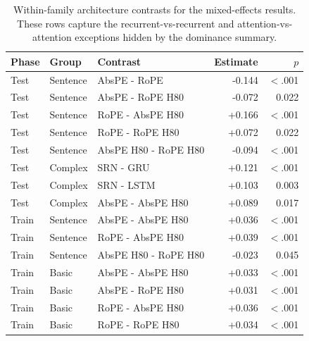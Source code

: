\begin{table}[t]
\centering\scriptsize
\begin{tabular}{@{}lllrr@{}}
\toprule
\textbf{Phase} & \textbf{Group} & \textbf{Contrast} & \textbf{Estimate} & $p$ \\
\midrule
Test & Sentence & AbsPE - RoPE & -0.144 & $<$.001 \\
Test & Sentence & AbsPE - RoPE H80 & -0.072 & 0.022 \\
Test & Sentence & RoPE - AbsPE H80 & +0.166 & $<$.001 \\
Test & Sentence & RoPE - RoPE H80 & +0.072 & 0.022 \\
Test & Sentence & AbsPE H80 - RoPE H80 & -0.094 & $<$.001 \\
Test & Complex & SRN - GRU & +0.121 & $<$.001 \\
Test & Complex & SRN - LSTM & +0.103 & 0.003 \\
Test & Complex & AbsPE - AbsPE H80 & +0.089 & 0.017 \\
Train & Sentence & AbsPE - AbsPE H80 & +0.036 & $<$.001 \\
Train & Sentence & RoPE - AbsPE H80 & +0.039 & $<$.001 \\
Train & Sentence & AbsPE H80 - RoPE H80 & -0.023 & 0.045 \\
Train & Basic & AbsPE - AbsPE H80 & +0.033 & $<$.001 \\
Train & Basic & AbsPE - RoPE H80 & +0.031 & $<$.001 \\
Train & Basic & RoPE - AbsPE H80 & +0.036 & $<$.001 \\
Train & Basic & RoPE - RoPE H80 & +0.034 & $<$.001 \\
\bottomrule
\end{tabular}
\caption{\small Within-family architecture contrasts for the mixed-effects results. These rows capture the recurrent-vs-recurrent and attention-vs-attention exceptions hidden by the dominance summary.}
\label{tab:mixed_effects_arch_family_exceptions}
\end{table}
